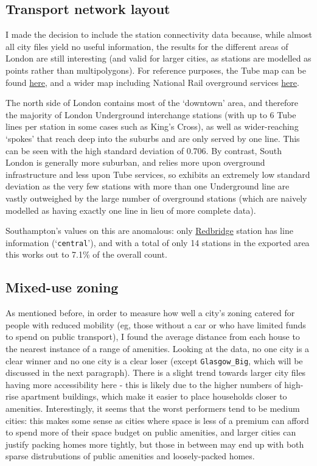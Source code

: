 \documentclass[12pt]{article} %
\begin{document}
\subsection{Transport network layout}
I made the decision to include the station connectivity data because, while almost all city files yield no useful information, the results for the different areas of London are still interesting (and valid for larger cities, as stations are modelled as points rather than multipolygons). For reference purposes, the Tube map can be found \href{https://content.tfl.gov.uk/standard-tube-map.pdf}{here}, and a wider map including National Rail overground services \href{https://content.tfl.gov.uk/london-rail-and-tube-services-map.pdf}{here}.

The north side of London contains most of the `downtown' area, and therefore the majority of London Underground interchange stations (with up to 6 Tube lines per station in some cases such as King's Cross), as well as wider-reaching `spokes' that reach deep into the suburbs and are only served by one line. This can be seen with the high standard deviation of 0.706. By contrast, South London is generally more suburban, and relies more upon overground infrastructure and less upon Tube services, so exhibits an extremely low standard deviation as the very few stations with more than one Underground line are vastly outweighed by the large number of overground stations (which are naively modelled as having exactly one line in lieu of more complete data).

Southampton's values on this are anomalous: only \href{https://www.openstreetmap.org/node/7170492253}{Redbridge} station has line information (`\texttt{central}'), and with a total of only 14 stations in the exported area this works out to 7.1\% of the overall count.

\subsection{Mixed-use zoning}
As mentioned before, in order to measure how well a city's zoning catered for people with reduced mobility (eg, those without a car or who have limited funds to spend on public transport), I found the average distance from each house to the nearest instance of a range of amenities. Looking at the data, no one city is a clear winner and no one city is a clear loser (except \texttt{Glasgow\_Big}, which will be discussed in the next paragraph). There is a slight trend towards larger city files having more accessibility here - this is likely due to the higher numbers of high-rise apartment buildings, which make it easier to place households closer to amenities. Interestingly, it seems that the worst performers tend to be medium cities: this makes some sense as cities where space is less of a premium can afford to spend more of their space budget on public amenities, and larger cities can justify packing homes more tightly, but those in between may end up with both sparse distrubutions of public amenities and loosely-packed homes.
\end{document}

